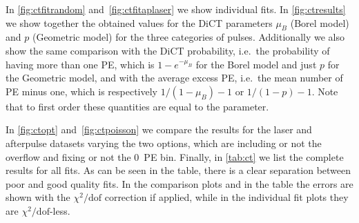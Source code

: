 In \autoref{fig:ctfitrandom} and~\ref{fig:ctfitaplaser} we show individual
fits. In \autoref{fig:ctresults} we show together the obtained values for the
DiCT parameters $\mu_B$ (Borel model) and $p$ (Geometric model) for the three
categories of pulses. Additionally we also show the same comparison with the
DiCT probability, i.e.\ the probability of having more than one PE, which is
$1-e^{-\mu_B}$ for the Borel model and just $p$ for the Geometric model, and
with the average excess PE, i.e.\ the mean number of PE minus one, which is
respectively $1/(1-\mu_B)-1$ or $1/(1-p)-1$. Note that to first order these
quantities are equal to the parameter.

In \autoref{fig:ctopt} and~\ref{fig:ctpoisson} we compare the results for the
laser and afterpulse datasets varying the two options, which are including or
not the overflow and fixing or not the 0~PE bin. Finally, in \autoref{tab:ct}
we list the complete results for all fits. As can be seen in the table, there
is a clear separation between poor and good quality fits. In the comparison
plots and in the table the errors are shown with the $\chi^2/\mathrm{dof}$
correction if applied, while in the individual fit plots they are
$\chi^2/\mathrm{dof}$-less.

\begin{figure}
    
    
    
\end{figure}

\begin{figure}
    

    
\end{figure}

\begin{figure}
    
    
    
\end{figure}


